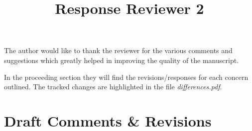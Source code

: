 \documentclass{article}
\begin{document}
\title{Response Reviewer 2}
\maketitle

The author would like to thank the reviewer for the various comments
and suggestions which greatly helped in improving the quality of the manuscript. 

In the proceeding section they will find the revisions/responses for
each concern outlined. The tracked changes are highlighted in the file \emph{differences.pdf}.

\section*{Draft Comments \& Revisions}
\end{document}
